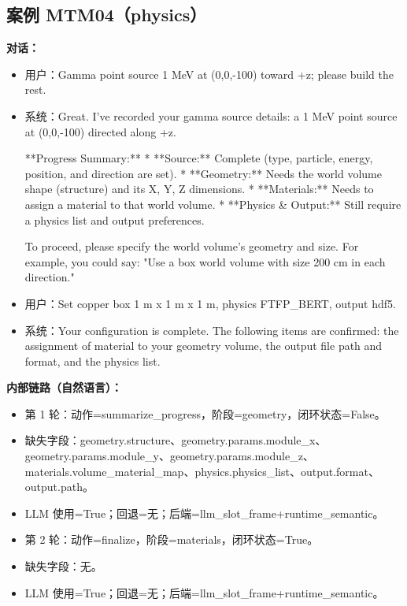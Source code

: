 \documentclass[11pt]{ctexart}
\begin{document}
\subsection{案例 MTM04（physics）}
\textbf{对话：}
\begin{itemize}
\item 用户：Gamma point source 1 MeV at (0,0,-100) toward +z; please build the rest.
\item 系统：Great. I've recorded your gamma source details: a 1 MeV point source at (0,0,-100) directed along +z.

**Progress Summary:**
*   **Source:** Complete (type, particle, energy, position, and direction are set).
*   **Geometry:** Needs the world volume shape (structure) and its X, Y, Z dimensions.
*   **Materials:** Needs to assign a material to that world volume.
*   **Physics \& Output:** Still require a physics list and output preferences.

To proceed, please specify the world volume's geometry and size. For example, you could say: "Use a box world volume with size 200 cm in each direction."
\item 用户：Set copper box 1 m x 1 m x 1 m, physics FTFP\_BERT, output hdf5.
\item 系统：Your configuration is complete. The following items are confirmed: the assignment of material to your geometry volume, the output file path and format, and the physics list.
\end{itemize}
\textbf{内部链路（自然语言）：}
\begin{itemize}
\item 第 1 轮：动作=summarize\_progress，阶段=geometry，闭环状态=False。
\item 缺失字段：geometry.structure、geometry.params.module\_x、geometry.params.module\_y、geometry.params.module\_z、materials.volume\_material\_map、physics.physics\_list、output.format、output.path。
\item LLM 使用=True；回退=无；后端=llm\_slot\_frame+runtime\_semantic。
\item 第 2 轮：动作=finalize，阶段=materials，闭环状态=True。
\item 缺失字段：无。
\item LLM 使用=True；回退=无；后端=llm\_slot\_frame+runtime\_semantic。
\end{itemize}
\end{document}
